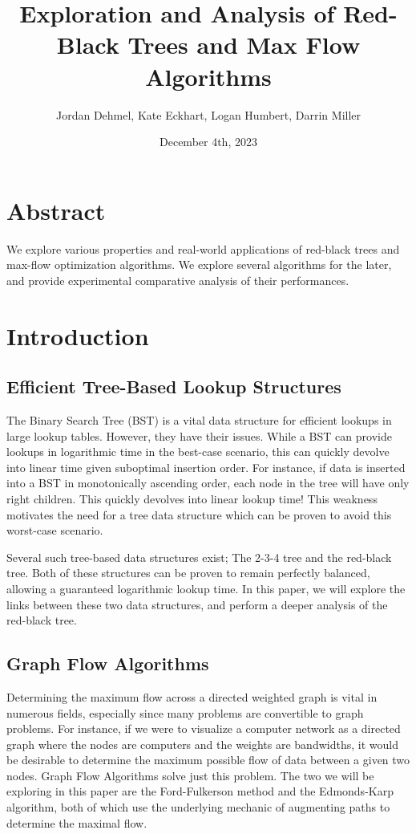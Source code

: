 \documentclass[12pt]{amsart}
\title{Exploration and Analysis of Red-Black Trees and Max Flow
    Algorithms}
\author{Jordan Dehmel, Kate Eckhart, Logan Humbert, Darrin
    Miller}
\date{December 4th, 2023}
\begin{document}
\maketitle

\tableofcontents

\section{Abstract}

    We explore various properties and real-world applications of
    red-black trees and max-flow optimization algorithms. We
    explore several algorithms for the later, and provide
    experimental comparative analysis of their performances.

\newpage
\section{Introduction}

\subsection{Efficient Tree-Based Lookup Structures}

    The Binary Search Tree (BST) is a vital data structure for
    efficient lookups in large lookup tables. However, they have
    their issues. While a BST can provide lookups in logarithmic
    time in the best-case scenario, this can quickly devolve
    into linear time given suboptimal insertion order. For
    instance, if data is inserted into a BST in monotonically
    ascending order, each node in the tree will have only right
    children. This quickly devolves into linear lookup time!
    This weakness motivates the need for a tree data structure
    which can be proven to avoid this worst-case scenario.

    Several such tree-based data structures exist; The 2-3-4
    tree and the red-black tree. Both of these structures can
    be proven to remain perfectly balanced, allowing a
    guaranteed logarithmic lookup time. In this paper, we will
    explore the links between these two data structures, and
    perform a deeper analysis of the red-black tree.

\subsection{Graph Flow Algorithms}

    Determining the maximum flow across a directed weighted
    graph is vital in numerous fields, especially since many
    problems are convertible to graph problems. For instance, if
    we were to visualize a computer network as a directed graph
    where the nodes are computers and the weights are
    bandwidths, it would be desirable to determine the maximum
    possible flow of data between a given two nodes. Graph Flow
    Algorithms solve just this problem. The two we will be
    exploring in this paper are the Ford-Fulkerson method and
    the Edmonds-Karp algorithm, both of which use the underlying
    mechanic of augmenting paths to determine the maximal flow.
\end{document}
